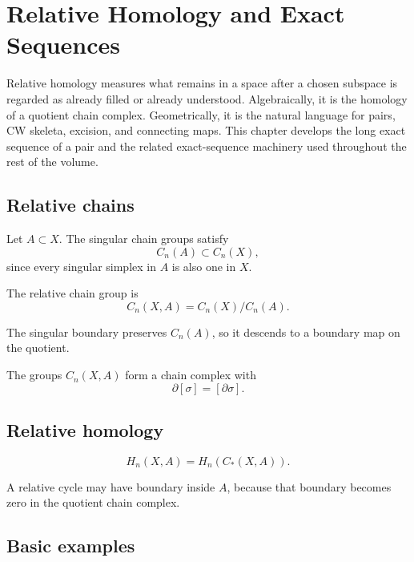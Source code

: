 ﻿\chapter{Relative Homology and Exact Sequences}
\label{ch:viii19-relative-homology-exact-sequences}

Relative homology measures what remains in a space after a chosen subspace is
regarded as already filled or already understood.  Algebraically, it is the
homology of a quotient chain complex.  Geometrically, it is the natural
language for pairs, CW skeleta, excision, and connecting maps.  This chapter
develops the long exact sequence of a pair and the related exact-sequence
machinery used throughout the rest of the volume.

\section{Relative chains}

Let \(A\subset X\).  The singular chain groups satisfy
\[
C_n(A)\subset C_n(X),
\]
since every singular simplex in \(A\) is also one in \(X\).

\begin{definition}
\label{def:viii19-relative-chain}
The relative chain group is
\[
C_n(X,A)=C_n(X)/C_n(A).
\]
\end{definition}

The singular boundary preserves \(C_n(A)\), so it descends to a boundary map
on the quotient.

\begin{proposition}
\label{prop:viii19-relative-complex}
The groups \(C_n(X,A)\) form a chain complex with
\[
\partial[\sigma]=[\partial\sigma].
\]
\end{proposition}

\section{Relative homology}

\begin{definition}
\label{def:viii19-relative-homology}
\[
H_n(X,A)=H_n(C_*(X,A)).
\]
\end{definition}

A relative cycle may have boundary inside \(A\), because that boundary becomes
zero in the quotient chain complex.

\section{Basic examples}

